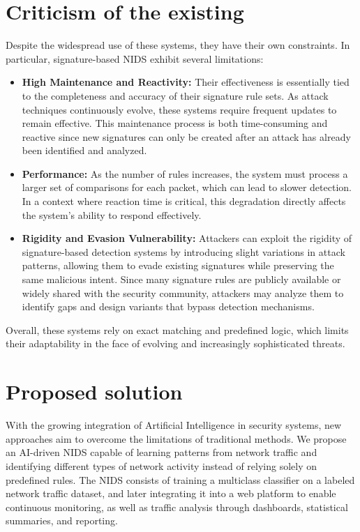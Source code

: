 \section{Criticism of the existing}
\vspace{-0.2cm}
Despite the widespread use of these systems, they have their own constraints. In particular, signature-based NIDS exhibit several limitations:
\begin{itemize}
    \item \textbf{High Maintenance and Reactivity:} Their effectiveness is essentially tied to the completeness and accuracy of their signature rule sets. As attack techniques continuously evolve, these systems require frequent updates to remain effective. This maintenance process is both time-consuming and reactive since new signatures can only be created after an attack has already been identified and analyzed.
    \item \textbf{Performance:} As the number of rules increases, the system must process a larger set of comparisons for each packet, which can lead to slower detection. In a context where reaction time is critical, this degradation directly affects the system’s ability to respond effectively.
    \item \textbf{Rigidity and Evasion Vulnerability:} Attackers can exploit the rigidity of signature-based detection systems by introducing slight variations in attack patterns, allowing them to evade existing signatures while preserving the same malicious intent. Since many signature rules are publicly available or widely shared with the security community, attackers may analyze them to identify gaps and design variants that bypass detection mechanisms.
\end{itemize}
Overall, these systems rely on exact matching and predefined logic, which limits their adaptability in the face of evolving and increasingly sophisticated threats.

\vspace{-0.9cm}
\section{Proposed solution}
\vspace{-0.2cm}
With the growing integration of Artificial Intelligence in security systems, new approaches aim to overcome the limitations of traditional methods. We propose an AI-driven NIDS capable of learning patterns from network traffic and identifying different types of network activity instead of relying solely on predefined rules. 
The NIDS consists of training a multiclass classifier on a labeled network traffic dataset, and later integrating it into a web platform to enable continuous monitoring, as well as traffic analysis through dashboards, statistical summaries, and reporting.
\vspace{-0.9cm}
